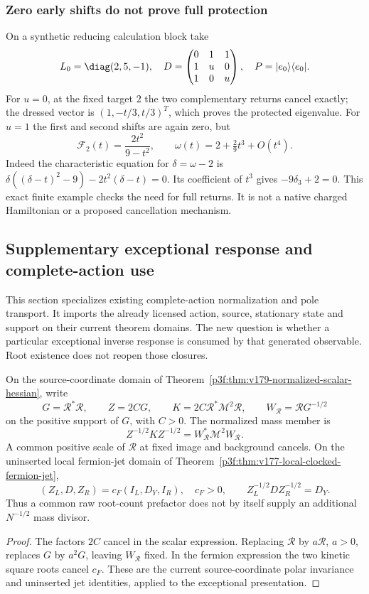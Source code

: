 \documentclass[11pt,a4paper]{article}
\begin{document}
\subsubsection{Zero early shifts do not prove full protection}
On a synthetic reducing calculation block take
\[
 L_0=\diag(2,5,-1),\quad
 D=\begin{pmatrix}0&1&1\\1&u&0\\1&0&u\end{pmatrix},\quad
 P=|e_0\rangle\langle e_0|.
\]
For $u=0$, at the fixed target $2$ the two complementary returns cancel
exactly; the dressed vector is $(1,-t/3,t/3)^T$, which proves the protected
eigenvalue. For $u=1$ the first and second shifts are again zero, but
\[
 \mathcal F_2(t)=\frac{2t^2}{9-t^2},\qquad
 \omega(t)=2+\tfrac29t^3+O(t^4).
\]
Indeed the characteristic equation for $\delta=\omega-2$ is
$\delta((\delta-t)^2-9)-2t^2(\delta-t)=0$.
Its coefficient of $t^3$ gives $-9\delta_3+2=0$.
This exact finite example checks the need for full returns. It is not a
native charged Hamiltonian or a proposed cancellation mechanism.




\subsection{Supplementary exceptional response and complete-action use}
\label{p3f:app:exroot-physical-use}

This section specializes existing complete-action normalization and pole
transport. It imports the already licensed action, source, stationary
state and support on their current theorem domains. The new question is
whether a particular exceptional inverse response is consumed by that
generated observable. Root existence does not reopen those closures.

\begin{corollary}
\label{p3f:cor:exroot-common-scale-cancellation}
On the source-coordinate domain of
Theorem~\ref{p3f:thm:v179-normalized-scalar-hessian}, write
\[
 G=\mathcal R^*\mathcal R,\qquad
 Z=2CG,\qquad
 K=2C\mathcal R^*\mathcal M^2\mathcal R,\qquad
 W_{\mathcal R}=\mathcal R G^{-1/2}
\]
on the positive support of \(G\), with \(C>0\).
The normalized mass member is
\[
 Z^{-1/2}KZ^{-1/2}
 =W_{\mathcal R}^*\mathcal M^2W_{\mathcal R}.
\]
A common positive scale of \(\mathcal R\) at fixed image and background
cancels. On the uninserted local fermion-jet domain of
Theorem~\ref{p3f:thm:v177-local-clocked-fermion-jet},
\[
 (Z_L,D,Z_R)=c_F(I_L,D_Y,I_R),\quad c_F>0,
 \qquad Z_L^{-1/2}DZ_R^{-1/2}=D_Y.
\]
Thus a common raw root-count prefactor does not by itself supply an
additional \(N^{-1/2}\) mass divisor.
\end{corollary}
\begin{proof}
The factors \(2C\) cancel in the scalar expression.
Replacing \(\mathcal R\) by \(a\mathcal R\), \(a>0\), replaces \(G\)
by \(a^2G\), leaving \(W_{\mathcal R}\) fixed.
In the fermion expression the two kinetic square roots cancel \(c_F\).
These are the current source-coordinate polar invariance and uninserted
jet identities, applied to the exceptional presentation.
\end{proof}
\end{document}
